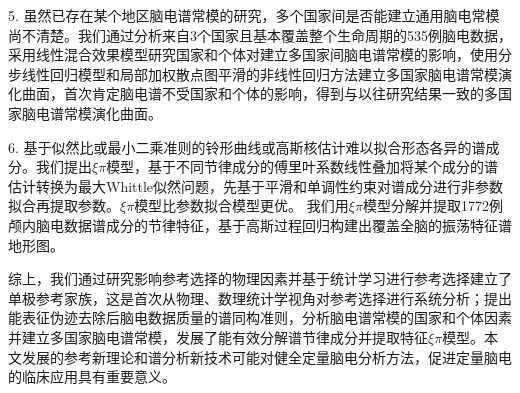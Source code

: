 \begin{chineseabstract}
5. 虽然已存在某个地区脑电谱常模的研究，多个国家间是否能建立通用脑电常模尚不清楚。我们通过分析来自3个国家且基本覆盖整个生命周期的535例脑电数据，采用线性混合效果模型研究国家和个体对建立多国家间脑电谱常模的影响，使用分步线性回归模型和局部加权散点图平滑的非线性回归方法建立多国家脑电谱常模演化曲面，首次肯定脑电谱不受国家和个体的影响，得到与以往研究结果一致的多国家脑电谱常模演化曲面。

6. 基于似然比或最小二乘准则的铃形曲线或高斯核估计难以拟合形态各异的谱成分。我们提出$\xi\pi$模型，基于不同节律成分的傅里叶系数线性叠加将某个成分的谱估计转换为最大Whittle似然问题，先基于平滑和单调性约束对谱成分进行非参数拟合再提取参数。$\xi\pi$模型比参数拟合模型更优。
我们用$\xi\pi$模型分解并提取1772例颅内脑电数据谱成分的节律特征，基于高斯过程回归构建出覆盖全脑的振荡特征谱地形图。

综上，我们通过研究影响参考选择的物理因素并基于统计学习进行参考选择建立了单极参考家族，这是首次从物理、数理统计学视角对参考选择进行系统分析；提出能表征伪迹去除后脑电数据质量的谱同构准则，分析脑电谱常模的国家和个体因素并建立多国家脑电谱常模，发展了能有效分解谱节律成分并提取特征$\xi\pi$模型。本文发展的参考新理论和谱分析新技术可能对健全定量脑电分析方法，促进定量脑电的临床应用具有重要意义。

\end{chineseabstract}


